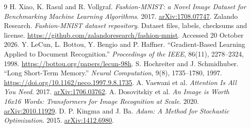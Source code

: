 {}
\begin{thebibliography}{9}
\setlength{\itemsep}{8pt}
H. Xiao, K. Rasul and R. Vollgraf.
\emph{Fashion-MNIST: a Novel Image Dataset for Benchmarking Machine Learning Algorithms}.
2017. \href{https://arxiv.org/abs/1708.07747}{arXiv:1708.07747}.
Zalando Research. \emph{Fashion-MNIST dataset repository}.
Dataset files, labels, checksums and license.
\url{https://github.com/zalandoresearch/fashion-mnist}.
Accessed 20 October 2026.
Y. LeCun, L. Bottou, Y. Bengio and P. Haffner.
``Gradient-Based Learning Applied to Document Recognition.''
\emph{Proceedings of the IEEE}, 86(11), 2278--2324, 1998.
\url{https://bottou.org/papers/lecun-98h}.
S. Hochreiter and J. Schmidhuber.
``Long Short-Term Memory.''
\emph{Neural Computation}, 9(8), 1735--1780, 1997.
\url{https://doi.org/10.1162/neco.1997.9.8.1735}.
A. Vaswani et al. \emph{Attention Is All You Need}.
2017. \href{https://arxiv.org/abs/1706.03762}{arXiv:1706.03762}.
A. Dosovitskiy et al.
\emph{An Image is Worth 16x16 Words: Transformers for Image Recognition at Scale}.
2020. \href{https://arxiv.org/abs/2010.11929}{arXiv:2010.11929}.
D. P. Kingma and J. Ba.
\emph{Adam: A Method for Stochastic Optimization}.
2015. \href{https://arxiv.org/abs/1412.6980}{arXiv:1412.6980}.
\end{thebibliography}
